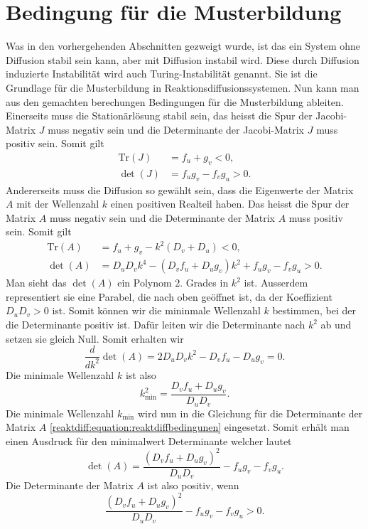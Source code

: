 \section{Bedingung für die Musterbildung
\label{reaktdiff:section:diffusioninduzierteInstabilitaet}}
Was in den vorhergehenden Abschnitten gezweigt wurde, ist das ein System ohne Diffusion stabil sein kann, aber mit Diffusion instabil wird.
Diese durch Diffusion induzierte Instabilität wird auch Turing-Instabilität genannt.
Sie ist die Grundlage für die Musterbildung in Reaktionsdiffusionssystemen.
Nun kann man aus den gemachten berechungen Bedingungen für die Musterbildung ableiten.
Einerseits muss die Stationärlösung stabil sein, das heisst die Spur der Jacobi-Matrix \(J\) muss negativ sein und die Determinante der Jacobi-Matrix \(J\) muss positiv sein.
Somit gilt
\begin{align*}
    \text{Tr}(J) &= f_u + g_v < 0, \\
    \det(J) &= f_u g_v - f_v g_u > 0.
\end{align*}
Andererseits muss die Diffusion so gewählt sein, dass die Eigenwerte der Matrix \(A\) mit der Wellenzahl \(k\) einen positiven Realteil haben.
Das heisst die Spur der Matrix \(A\) muss negativ sein und die Determinante der Matrix \(A\) muss positiv sein.
Somit gilt
\begin{align}
    \text{Tr}(A) &= f_u  + g_v - k^2(D_v + D_u)  < 0, \\
    \det(A) &= D_uD_vk^4 - (D_vf_u + D_ug_v)k^2 + f_u g_v - f_v g_u > 0.
    \label{reaktdiff:equation:reaktdiffbedingunen}
\end{align}
Man sieht das \(\det(A)\) ein Polynom 2. Grades in \(k^2\) ist.
Ausserdem representiert sie eine Parabel, die nach oben geöffnet ist, da der Koeffizient \(D_uD_v > 0\) ist.
Somit können wir die mininmale Wellenzahl \(k\) bestimmen, bei der die Determinante positiv ist.
Dafür leiten wir die Determinante nach \(k^2\) ab und setzen sie gleich Null.
Somit erhalten wir
\begin{equation*}
    \frac{d}{dk^2} \det(A) = 2D_uD_vk^2 - D_v f_u - D_u g_v = 0.
\end{equation*}
Die minimale Wellenzahl \(k\) ist also
\begin{equation*}
    k^2_{\text{min}} = \frac{D_vf_u + D_ug_v}{D_uD_v}.
\end{equation*}
Die minimale Wellenzahl \(k_{\text{min}}\) wird nun in die Gleichung für die Determinante der Matrix \(A\) \ref{reaktdiff:equation:reaktdiffbedingunen} eingesetzt.
Somit erhält man einen Ausdruck für den minimalwert Determinante welcher lautet
\begin{equation*}
    \det(A) = \frac{(D_vf_u + D_ug_v)^2}{D_uD_v} - f_u g_v - f_v g_u.
\end{equation*}
Die Determinante der Matrix \(A\) ist also positiv, wenn
\begin{equation*}
    \frac{(D_vf_u + D_ug_v)^2}{D_uD_v} - f_u g_v - f_v g_u > 0.
\end{equation*}



